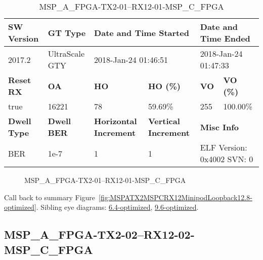\begin{table}[h]
\centering
\caption{MSP\_A\_FPGA-TX2-01--RX12-01-MSP\_C\_FPGA}
\label{tab:MSPAFPGATX201RX1201MSPCFPGA12.8-optimized}
\begin{tabular}{@{}|l|l|l|l|l|l|@{}}
\toprule
\textbf{SW Version}                & \textbf{GT Type}   & \multicolumn{2}{l|}{\textbf{Date and Time Started}}            & \multicolumn{2}{l|}{\textbf{Date and Time Ended}}        \\ \midrule
2017.2                       & UltraScale GTY          & \multicolumn{2}{l|}{2018-Jan-24 01:46:51}                   & \multicolumn{2}{l|}{2018-Jan-24 01:47:33}               \\ \midrule
\textbf{Reset RX}                  & \textbf{OA} & \textbf{HO}   & \textbf{HO (\%)} & \textbf{VO} & \textbf{VO (\%)} \\ \midrule
true & 16221        & 78          & 59.69\%        & 255        & 100.00\%       \\ \midrule
\textbf{Dwell Type}                & \textbf{Dwell BER} & \textbf{Horizontal Increment} & \textbf{Vertical Increment}    & \multicolumn{2}{l|}{\textbf{Misc Info}}                  \\ \midrule
BER                            & 1e-7        & 1        & 1           & \multicolumn{2}{l|}{ELF Version: 0x4002 SVN: 0}                         \\ \bottomrule
\end{tabular}
\end{table}

\begin{figure}[h]
\caption{MSP\_A\_FPGA-TX2-01--RX12-01-MSP\_C\_FPGA} \label{fig:MSPAFPGATX201RX1201MSPCFPGA12.8-optimized}
\end{figure}

Call back to summary Figure~\ref{fig:MSPATX2MSPCRX12MinipodLoopback12.8-optimized}.
Sibling eye diagrams: \hyperref[sec:MSPAFPGATX201RX1201MSPCFPGA6.4-optimized]{6.4-optimized}, \hyperref[sec:MSPAFPGATX201RX1201MSPCFPGA9.6-optimized]{9.6-optimized}.

\clearpage
\newpage


\subsection{MSP\_A\_FPGA-TX2-02--RX12-02-MSP\_C\_FPGA}\label{sec:MSPAFPGATX202RX1202MSPCFPGA12.8-optimized}

